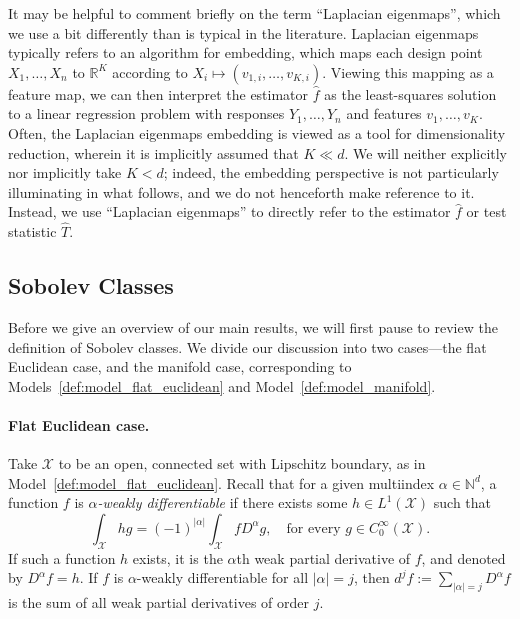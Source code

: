 \documentclass{article}
\newcommand{\Reals}{\mathbb{R}}
\newcommand{\1}{\mathbf{1}}
\newcommand{\mc}[1]{\mathcal{#1}}
\newcommand{\wh}[1]{\widehat{#1}}
\theoremstyle{alden}
\theoremstyle{aldenthm}
\theoremstyle{definition}
\theoremstyle{remark}
\begin{document}
It may be helpful to comment briefly on the term ``Laplacian eigenmaps'', which we use a bit differently than is typical in the literature. Laplacian eigenmaps typically refers to an algorithm for embedding, which maps each design point $X_1,\ldots,X_n$ to $\Reals^K$ according to $X_i \mapsto (v_{1,i}, \ldots, v_{K,i})$. Viewing this mapping as a feature map, we can then interpret the estimator $\wh{f}$ as the least-squares solution to a linear regression problem with responses $Y_1,\ldots,Y_n$ and features $v_1,\ldots,v_K$. Often, the Laplacian eigenmaps embedding is viewed as a tool for dimensionality reduction, wherein it is implicitly assumed that $K \ll d$. We will neither explicitly nor implicitly take $K < d$; indeed, the embedding perspective is not particularly illuminating in what follows, and we do not henceforth make reference to it. Instead, we use ``Laplacian eigenmaps'' to directly refer to the estimator $\wh{f}$ or test statistic $\wh{T}$. 


\subsection{Sobolev Classes}
\label{sec:sobolev}
Before we give an overview of our main results, we will first pause to review the definition of Sobolev classes. We divide our discussion into two cases---the flat Euclidean case, and the manifold case, corresponding to Models~\ref{def:model_flat_euclidean} and Model~\ref{def:model_manifold}.

\paragraph{Flat Euclidean case.}
Take $\mc{X}$ to be an open, connected set with Lipschitz boundary, as in Model~\ref{def:model_flat_euclidean}. Recall that for a given multiindex $\alpha \in \mathbb{N}^d$, a function $f$ is \emph{$\alpha$-weakly differentiable} if there exists some $h \in L^1(\mc{X})$ such that
\begin{equation*}
\int_{\mc{X}} h g = (-1)^{|\alpha|} \int_{\mc{X}} f D^{\alpha}g, \quad \textrm{for every $g \in C_0^{\infty}(\mc{X})$.}
\end{equation*}
If such a function $h$ exists, it is the $\alpha$th weak partial derivative of $f$, and denoted by $D^{\alpha}f = h$. If $f$ is $\alpha$-weakly differentiable for all $|\alpha| = j$, then $d^jf := \sum_{|\alpha| = j}D^{\alpha}f$ is the sum of all weak partial derivatives of order $j$. 
\end{document}
